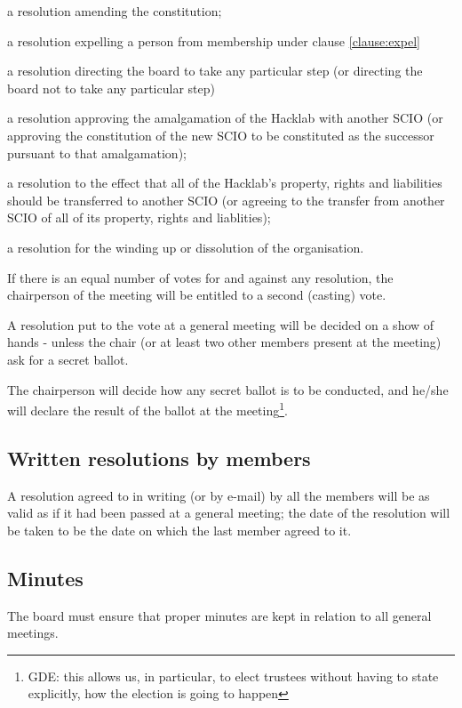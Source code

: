 \documentclass{article}
\begin{document}
\subclause a resolution amending the constitution;

\subclause a resolution expelling a person from membership under
clause \ref{clause:expel}

\subclause a resolution directing the board to take any particular
step (or directing the board not to take any particular step)

\subclause a resolution approving the amalgamation of the Hacklab with
another SCIO (or approving the constitution of the new SCIO to be
constituted as the successor pursuant to that amalgamation);

\subclause a resolution to the effect that all of the Hacklab's
property, rights and liabilities should be transferred to another SCIO
(or agreeing to the transfer from another SCIO of all of its property,
rights and liablities);

\subclause a resolution for the winding up or dissolution of the
organisation.

\clause If there is an equal number of votes for and against any
resolution, the chairperson of the meeting will be entitled to a
second (casting) vote.

\clause A resolution put to the vote at a general meeting will be
decided on a show of hands - unless the chair (or at least two other
members present at the meeting) ask for a secret ballot.

\clause The chairperson will decide how any secret ballot is to be
conducted, and he/she will declare the result of the ballot at the
meeting\footnote{GDE: this allows us, in particular, to elect trustees
  without having to state explicitly, how the election is going to happen}.

\subsection{Written resolutions by members}

\clause A resolution agreed to in writing (or by e-mail) by all the
members will be as valid as if it had been passed at a general
meeting; the date of the resolution will be taken to be the date on
which the last member agreed to it.

\subsection{Minutes}

\clause The board must ensure that proper minutes are kept in relation
to all general meetings.
\end{document}
